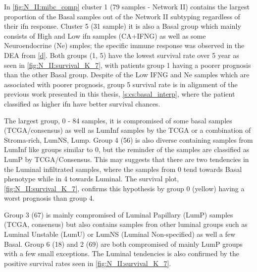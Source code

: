 
In \cref{fig:N_II:mibc_comp} cluster 1 (79 samples - Network II) contains the largest proportion of the Basal samples out of the Network II subtyping regardless of their \acrfull{ifn} response. Cluster 5 (31 sample) it is also a Basal group which mainly consists of High and Low \acrshort{ifn} samples (CA+IFNG) as well as some Neuroendocrine (Ne) smples; the specific immune response was observed in the DEA from \cref{d}. Both groups (1, 5) have the lowest survival rate over 5 year as seen in \cref{fig:N_II:survival_K_7}, with patients group 1 having a poorer prognosis than the other Basal group. Despite of the Low IFNG and Ne samples which are associated with poorer prognosis, group 5 survival rate is in alignment of the previous work presented in this thesis, \cref{s:cs:basal_interp}, where the patient classified as higher \acrshort{ifn} have better survival chances.

The largest group, 0 - 84 samples, it is compromised of some basal samples (TCGA/consensus) as well as LumInf samples by the TCGA or a combination of Stroma-rich, LumNS, Lump. Group 4 (56) is also diverse containing samples from LumInf like groups similar to 0, but the reminder of the samples are classified as LumP by TCGA/Consensus. This may suggests that there are two tendencies in the Luminal infiltrated samples, where the samples from 0 tend towards Basal phenotype while in 4 towards Luminal. The survival plot, \cref{fig:N_II:survival_K_7}, confirms this hypothesis by group 0 (yellow) having a worst prognosis than group 4.

Group 3 (67) is mainly compromised of Luminal Papillary (LumP) samples (TCGA, consensus) but also contains samples fron other luminal groups such as Luminal Unstable (LumU) or LumNS (Luminal Non-specified) as well a few Basal. Group 6 (18) and 2 (69) are both compromised of mainly LumP groups with a few small exceptions. The Luminal tendencies is also confirmed by the positive survival rates seen in \cref{fig:N_II:survival_K_7}.

